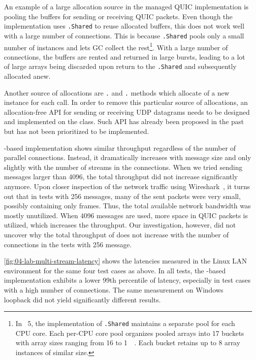 An example of a large allocation source in the managed QUIC implementation is pooling the buffers
for sending or receiving QUIC packets. Even though the implementation uses
\ArrayPoolOf{\Byte}\texttt{.Shared} to reuse allocated buffers, this does not work well with a large
number of connections. This is because \ArrayPoolOf{\Byte}\texttt{.Shared} pools only a small number
of \ArrayOf{\Byte} instances and lets GC collect the rest\footnote{In \dotnet{}~5, the
implementation of \ArrayPoolOf{\Byte}\texttt{.Shared} maintains a separate pool for each CPU core.
Each per-CPU core pool organizes pooled arrays into 17 buckets with array sizes ranging from
\SI{16}{\byte} to \SI{1}{\mebi\byte}. Each bucket retains up to 8 array instances of similar size.}.
With a large number of connections, the buffers are rented and returned in large bursts, leading to
a lot of large arrays being discarded upon return to the \ArrayPoolOf{\Byte}\texttt{.Shared} and
subsequently allocated anew.

Another source of allocations are \Socket{}\texttt{.} and
\Socket{}\texttt{.} methods which allocate of a new  instance
for each call. In order to remove this particular source of allocations, an allocation-free API for
sending or receiving UDP datagrams needs to be designed and implemented on the \Socket{} class. Such
API has already been proposed in the past~\cite{dotnetGithubZeroUdp} but has not been prioritized to
be implemented.

\libmsquic{}-based implementation shows similar throughput regardless of the number of parallel
connections. Instead, it dramatically increases with message size and only slightly with the number
of streams in the connections. When we tried sending messages larger than \SI{4096}{\byte}, the
total throughput did not increase significantly anymore. Upon closer inspection of the \libmsquic{}
network traffic using Wireshark~\cite{web:wireshark}, it turns out that in tests with
\SI{256}{\byte} messages, many of the sent packets were very small, possibly containing only \ACK{}
frames. Thus, the total available network bandwidth was mostly unutilized. When \SI{4096}{\byte}
messages are used, more space in QUIC packets is utilized, which increases the throughput. Our
investigation, however, did not uncover why the total throughput of \libmsquic{} does not increase
with the number of connections in the tests with \SI{256}{\byte} message.

\autoref{fig:04-lab-multi-stream-latency} shows the latencies measured in the Linux LAN environment
for the same four test cases as above. In all tests, the \libmsquic{}-based implementation exhibits
a lower 99th percentile of latency, especially in test cases with a high number of connections. The
same measurement on Windows loopback did not yield significantly different results.

